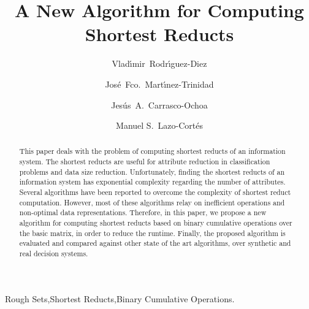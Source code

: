 \documentclass[authoryear,preprint,review,12pt]{elsarticle}
\begin{document}
	\title{A New Algorithm for Computing Shortest Reducts}
	
	\author[inaoe,uc]{Vlad\'{\i}mir~Rodr\'{\i}guez-Diez}
	\author[inaoe]{Jos\'{e}~Fco.~Mart\'{\i}nez-Trinidad}
	\author[inaoe]{Jes\'{u}s~A.~Carrasco-Ochoa}	
	\author[inaoe]{Manuel S.~Lazo-Cort\'{e}s}
	\address[inaoe]{Computer Science Department\\
					Instituto Nacional de Astrof\'{\i}sica, \'{O}ptica y Electr\'{o}nica\\
					Luis Enrique Erro \# 1, Santa Mar\'{\i}a Tonantzintla, Puebla, 72840, M\'{e}xico} 
	\address[uc]{Electrical Engineering Department\\
				 Universidad de Camag\"{u}ey\\
				 Circv. Nte. km 5$\frac{1}{2}$, Camag\"{u}ey, Cuba}
	
	\begin{abstract}
		This paper deals with the problem of computing shortest reducts of an information system. The shortest reducts are useful for attribute reduction in classification problems and data size reduction. Unfortunately, finding the shortest reducts of an information system has exponential complexity regarding the number of attributes. Several algorithms have been reported to overcome the complexity of shortest reduct computation. However, most of these algorithms relay on inefficient operations and non-optimal data representations. Therefore, in this paper, we propose a new algorithm for computing shortest reducts based on binary cumulative operations over the basic matrix, in order to reduce the runtime. Finally, the proposed algorithm is evaluated and compared against other state of the art algorithms, over synthetic and real decision systems.
	\end{abstract}
	
	\begin{keyword}
		Rough Sets\sep Shortest Reducts\sep Binary Cumulative Operations.
	\end{keyword}

	\maketitle

\end{document}
